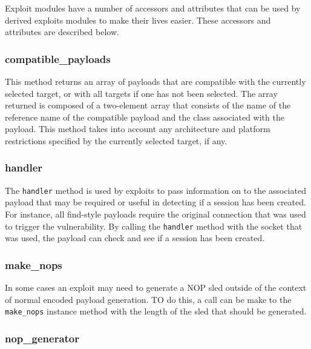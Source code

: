 \documentclass{report}
\begin{document}
\par
Exploit modules have a number of accessors and attributes that can
be used by derived exploits modules to make their lives easier.
These accessors and attributes are described below.

            \subsubsection{compatible\_payloads}

\par
This method returns an array of payloads that are compatible with
the currently selected target, or with all targets if one has not
been selected.  The array returned is composed of a two-element
array that consists of the name of the reference name of the
compatible payload and the class associated with the payload.  This
method takes into account any architecture and platform restrictions
specified by the currently selected target, if any.

            \subsubsection{handler}

\par
The \texttt{handler} method is used by exploits to pass information
on to the associated payload that may be required or useful in
detecting if a session has been created.  For instance, all
find-style payloads require the original connection that was used to
trigger the vulnerability.  By calling the \texttt{handler} method
with the socket that was used, the payload can check and see if a
session has been created.

            \subsubsection{make\_nops}

\par
In some cases an exploit may need to generate a NOP sled outside of
the context of normal encoded payload generation.  TO do this, a
call can be make to the \texttt{make\_nops} instance method with the
length of the sled that should be generated.

            \subsubsection{nop\_generator}
\end{document}

